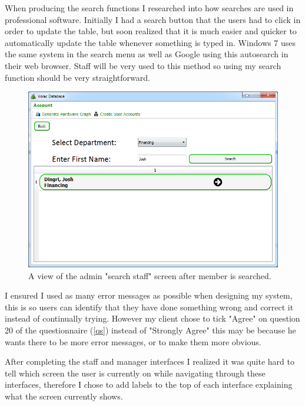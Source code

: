 When producing the search functions I researched into how searches are used in professional software. Initially I had a search button that the users had to click in order to update the table, but soon realized that it is much easier and quicker to automatically update the table whenever something is typed in. Windows 7 uses the same system in the search menu as well as Google using this autosearch in their web browser. Staff will be very used to this method so using my search function should be very straightforward.

\begin{figure}[H]
    \includegraphics[width=\textwidth]{./Evaluation/Images/afteradv.png}
    \caption{A view of the admin "search staff" screen after member is searched.}
\end{figure}

I ensured I used as many error messages as possible when designing my system, this is so users can identify that they have done something wrong and correct it instead of continually trying. However my client chose to tick "Agree" on question 20 of the questionnaire (\ref{qs}) instead of "Strongly Agree" this may be because he wants there to be more error messages, or to make them more obvious.

After completing the staff and manager interfaces I realized it was quite hard to tell which screen the user is currently on while navigating through these interfaces, therefore I chose to add labels to the top of each interface explaining what the screen currently shows.

